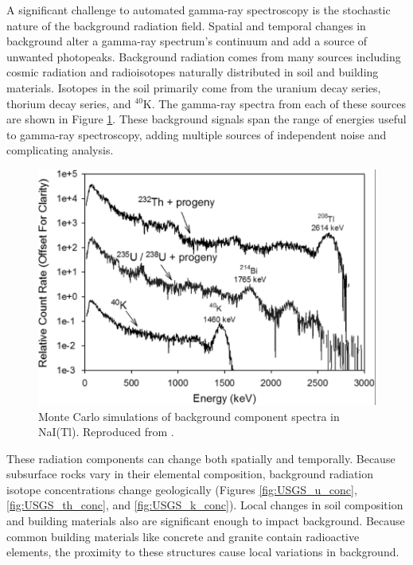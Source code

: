 A significant challenge to automated gamma-ray spectroscopy is the stochastic nature of the background radiation field. 
Spatial and temporal changes in background alter a gamma-ray spectrum's continuum and add a source of unwanted photopeaks. Background radiation comes from many sources including cosmic radiation and radioisotopes naturally distributed in soil and building materials. Isotopes in the soil primarily come from the uranium decay series, thorium  decay series, and $^{40}$K. The gamma-ray spectra from each of these sources are shown in Figure \ref{fig:background_components}. These background signals span the range of energies useful to gamma-ray spectroscopy, adding multiple sources of independent noise and complicating analysis.

\begin{figure}[H]
\centering
\includegraphics[width=0.8\linewidth]{images/background_components}
\caption{Monte Carlo simulations of background component spectra in NaI(Tl). Reproduced from \cite{KULISEK2015}.}
\label{fig:background_components}
\end{figure}

These radiation components can change both spatially and temporally. Because subsurface rocks vary in their elemental composition, background radiation isotope concentrations change geologically (Figures \ref{fig:USGS_u_conc}, \ref{fig:USGS_th_conc}, and \ref{fig:USGS_k_conc}). Local changes in soil composition and building materials also are significant enough to impact background. Because common building materials like concrete and granite contain radioactive elements, the proximity to these structures cause local variations in background. 

